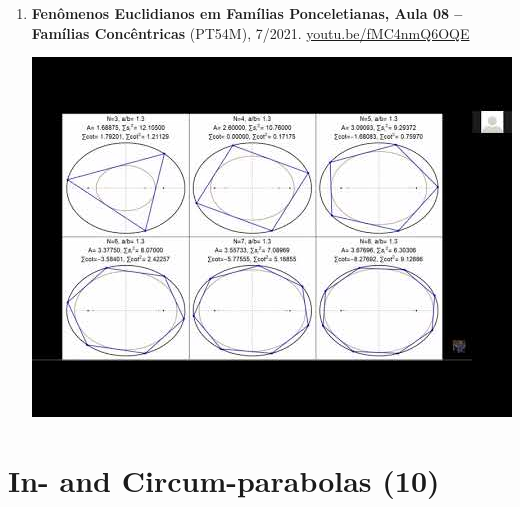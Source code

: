 \documentclass[12pt]{article}
\begin{document}
\begin{enumerate}[resume]
% 
\item \textbf{Fenômenos Euclidianos em Famílias Ponceletianas, Aula 08 -- Famílias Concêntricas} (PT54M), 7/2021. \href{https://youtu.be/fMC4nmQ6OQE}{\url{youtu.be/fMC4nmQ6OQE}}
\begin{center}\includegraphics[width=.5\textwidth]{pics/fMC4nmQ6OQE.jpg}\end{center}
% 
\end{enumerate}

\section{In- and Circum-parabolas (10)}
\end{document}
